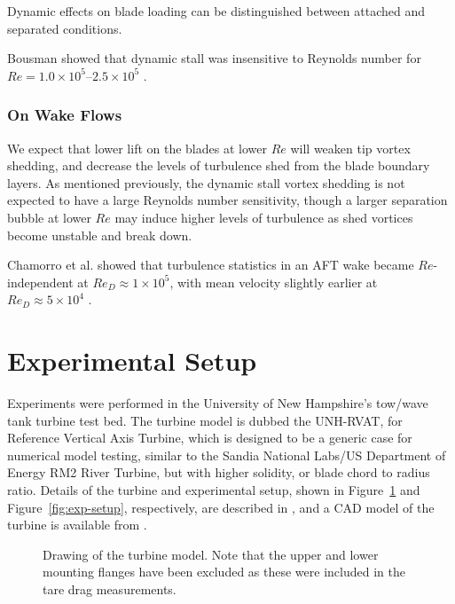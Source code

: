\documentclass[energies,article,accept,moreauthors,pdftex,12pt,a4paper]{mdpi}
\begin{document}
Dynamic effects on blade loading can be distinguished between attached and
separated conditions. 


Bousman showed that dynamic stall was insensitive to Reynolds number for $Re=1.0
\times 10^5$--$2.5 \times 10^5$ \cite{Bousman2000-evaluation}.

\subsubsection{On Wake Flows}

We expect that lower lift on the blades at lower $Re$ will weaken tip vortex
shedding, and decrease the levels of turbulence shed from the blade boundary
layers. As mentioned previously, the dynamic stall vortex shedding is not
expected to have a large Reynolds number sensitivity, though a larger separation
bubble at lower $Re$ may induce higher levels of turbulence as shed vortices
become unstable and break down.


Chamorro et al. showed that turbulence statistics in an AFT wake became
$Re$-independent at $Re_D \approx 1 \times 10^5$, with mean velocity slightly
earlier at $Re_D \approx 5 \times 10^4$ \cite{Chamorro2012}.

\section{Experimental Setup}

Experiments were performed in the University of New Hampshire's tow/wave tank
turbine test bed. The turbine model is dubbed the UNH-RVAT, for Reference
Vertical Axis Turbine, which is designed to be a generic case for numerical
model testing, similar to the Sandia National Labs/US Department of Energy RM2
River Turbine, but with higher solidity, or blade chord to radius ratio. Details
of the turbine and experimental setup, shown in Figure~\ref{fig:turbine} and
Figure~\ref{fig:exp-setup}, respectively, are described in
\cite{Bachant2015-JoT}, and a CAD model of the turbine is available from
\cite{Bachant2014-RVAT-CAD}.

\begin{figure}[ht!]
\caption{Drawing of the turbine model. Note that the upper and lower mounting
flanges have been excluded as these were included in the tare drag
measurements.} 
\label{fig:turbine}
\end{figure}
\end{document}
